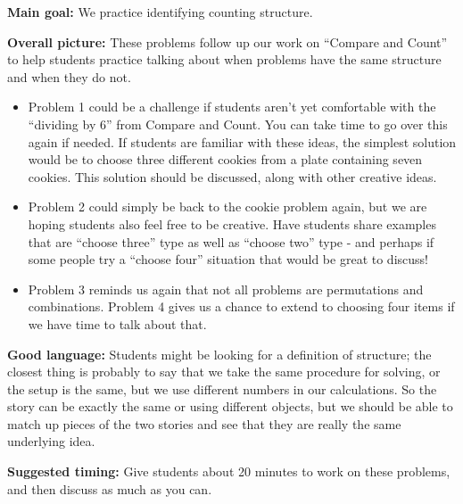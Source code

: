 \documentclass[nooutcomes,noauthor, handout]{ximera}
\begin{document}
\newpage

\begin{instructorNotes}

{\bf Main goal:} We practice identifying counting structure.


{\bf Overall picture:} These problems follow up our work on ``Compare and Count'' to help students practice talking about when problems have the same structure and when they do not.

\begin{itemize}
	\item Problem 1 could be a challenge if students aren't yet comfortable with the ``dividing by 6'' from Compare and Count. You can take time to go over this again if needed. If students are familiar with these ideas, the simplest solution would be to choose three different cookies from a plate containing seven cookies. This solution should be discussed, along with other creative ideas.
	\item Problem 2 could simply be back to the cookie problem again, but we are hoping students also feel free to be creative. Have students share examples that are ``choose three'' type as well as ``choose two'' type - and perhaps if some people try a ``choose four'' situation that would be great to discuss!
	\item Problem 3 reminds us again that not all problems are permutations and combinations. Problem 4 gives us a chance to extend to choosing four items if we have time to talk about that.
	
\end{itemize}

{\bf Good language:} Students might be looking for a definition of structure; the closest thing is probably to say that we take the same procedure for solving, or the setup is the same, but we use different numbers in our calculations. So the story can be exactly the same or using different objects, but we should be able to match up pieces of the two stories and see that they are really the same underlying idea.


{\bf Suggested timing:} Give students about 20 minutes to work on these problems, and then discuss as much as you can.

\end{instructorNotes}
\end{document}
